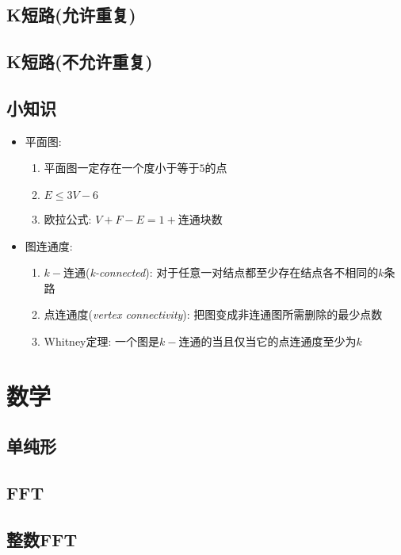 \documentclass[10pt, a4paper]{article}
\begin{document}
  \subsection{K短路(允许重复)}
    

  \subsection{K短路(不允许重复)}
    
  
  \subsection{小知识}
  \begin{itemize}
  \item 平面图: 
    \begin{enumerate}
    \item 平面图一定存在一个度小于等于$5$的点
    \item $E \le 3V - 6$
    \item 欧拉公式: $V + F - E = 1 + \mbox{连通块数}$
    \end{enumerate}
  \item 图连通度: 
    \begin{enumerate}
    \item $k-$连通(\emph{k-connected}): 对于任意一对结点都至少存在结点各不相同的$k$条路
    \item 点连通度(\emph{vertex connectivity}): 把图变成非连通图所需删除的最少点数
    \item Whitney定理: 一个图是$k-$连通的当且仅当它的点连通度至少为$k$
    \end{enumerate}
  \end{itemize}

\section{数学}
  \subsection{单纯形}
    

  \subsection{FFT}
    

  \subsection{整数FFT}
    
\end{document}
